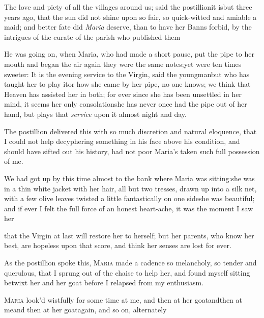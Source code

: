 \documentclass{article}
\begin{document}
The love and piety of all the villages around us; said the
postillion\tsh it is\break but three years ago, that the sun did
not shine upon so fair, so quick-witted and amiable a maid; and
better fate did \textit{Maria} deserve, than to have her Banns
forbid, by the intrigues of the curate of the parish who published
them\tsh

He was going on, when Maria, who had made a short pause,
put the pipe to her mouth and began the air
again \tsh they were the same notes;\tsh yet were
ten times sweeter: It is the evening service to the Virgin, said
the young\break man\tsh but who has taught her to play
it\tsk or how she came by her pipe, no one knows; we think that
Heaven has assisted her in both; for ever since she has been
unsettled in her mind, it seems her only
consolation\tsh she has never once had the pipe out of her
hand, but plays that \textit{service} upon it almost night and
day.

The postillion delivered this with so much discretion and natural eloquence, that I
could not help decyphering something in his face above his condition, and should
have sifted out his history, had not poor Maria's taken such full\break
possession of me.

We had got up by this time almost to the bank where Maria
was sitting:\break she was in a thin white jacket with her hair, all but
two tresses, drawn up into a silk net, with a few olive leaves
twisted a little fantastically on one side\tsh she was
beautiful; and if ever I felt the full force of an honest
heart-ache, it was the moment I saw her\tsh

\noindent
{}
that the Virgin at last will restore her to herself; but her parents, who know her
best, are hopeless upon that score, and think her senses are lost for ever.

As the postillion spoke this, \textsc{Maria} made a
cadence so melancholy, so tender and querulous, that I sprung out
of the chaise to help her, and found myself sitting betwixt
her and her goat before I relapsed from my enthusiasm.

\textsc{Maria} look’d wistfully for some time at me,
and then at her goat\tsh and\break then at me\tsh and
then at her goat\break again, and so on, alternately\tsh
\end{document}

